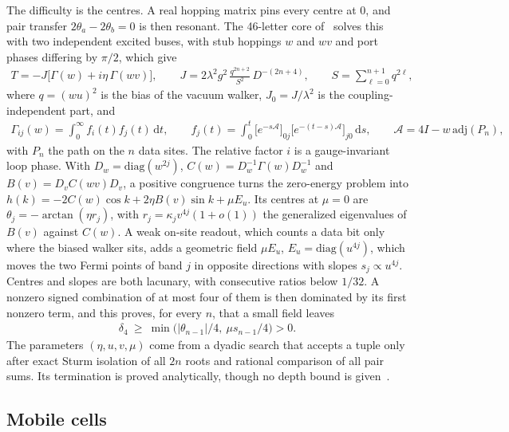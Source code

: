 \documentclass[11pt]{article}
\theoremstyle{definition}
\newcommand{\dd}{\mathrm{d}}
\begin{document}
The difficulty is the centres. A real hopping matrix pins every centre at $0$, and pair transfer $2\theta_a-2\theta_b=0$ is then resonant. The 46-letter core of~\cite{C39} solves this with two independent excited buses, with stub hoppings $w$ and $wv$ and port phases differing by $\pi/2$, which give
\begin{align}
T=-J\big[\Gamma(w)+i\eta\,\Gamma(wv)\big],\qquad
J=2\lambda^2g^2\,\frac{q^{2n+2}}{S^2}\,D^{-(2n+4)},\qquad S=\sum_{\ell=0}^{n+1}q^{2\ell},
\label{eq:T}
\end{align}
where $q=(wu)^2$ is the bias of the vacuum walker, $J_0=J/\lambda^2$ is the coupling-independent part, and
\begin{align}
\Gamma_{ij}(w)=\int_0^\infty f_i(t)f_j(t)\,\dd t,\qquad
f_j(t)=\int_0^t\big[e^{-s\mathcal A}\big]_{0j}\big[e^{-(t-s)\mathcal A}\big]_{j0}\,\dd s,\qquad \mathcal A=4I-w\,\mathrm{adj}(P_n),
\label{eq:Gamma}
\end{align}
with $P_n$ the path on the $n$ data sites. The relative factor $i$ is a gauge-invariant loop phase. With $D_w=\mathrm{diag}(w^{2j})$, $C(w)=D_w^{-1}\Gamma(w)D_w^{-1}$ and $B(v)=D_vC(wv)D_v$, a positive congruence turns the zero-energy problem into $h(k)=-2C(w)\cos k+2\eta B(v)\sin k+\mu E_u$. Its centres at $\mu=0$ are $\theta_j=-\arctan(\eta r_j)$, with $r_j=\kappa_jv^{4j}(1+o(1))$ the generalized eigenvalues of $B(v)$ against $C(w)$. A weak on-site readout, which counts a data bit only where the biased walker sits, adds a geometric field $\mu E_u$, $E_u=\mathrm{diag}(u^{4j})$, which moves the two Fermi points of band $j$ in opposite directions with slopes $s_j\propto u^{4j}$. Centres and slopes are both lacunary, with consecutive ratios below $1/32$. A nonzero signed combination of at most four of them is then dominated by its first nonzero term, and this proves, for every $n$, that a small field leaves
\begin{align}
\delta_4\ \ge\ \min\big(|\theta_{n-1}|/4,\ \mu s_{n-1}/4\big)>0 .
\label{eq:delta4}
\end{align}
The parameters $(\eta,u,v,\mu)$ come from a dyadic search that accepts a tuple only after exact Sturm isolation of all $2n$ roots and rational comparison of all pair sums. Its termination is proved analytically, though no depth bound is given~\cite{C39,C42,refC39}.

\subsection{Mobile cells}
\label{sec:mobile}
\end{document}
